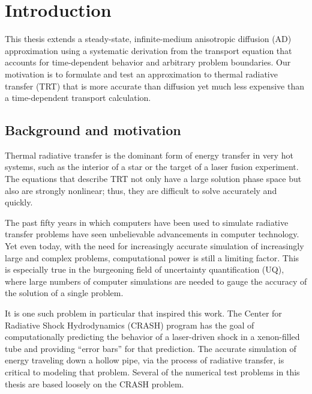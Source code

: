 
\chapter{Introduction}\label{chap:introduction}

This thesis extends a steady-state, infinite-medium anisotropic diffusion (AD)
approximation \cite{Mor2007,Lar2009c} using a systematic derivation from the
transport equation that accounts for time-dependent behavior and arbitrary
problem boundaries. Our motivation is to formulate and test an approximation to
thermal radiative transfer (TRT) that is more accurate than diffusion yet much
less expensive than a time-dependent transport calculation.

\section{Background and motivation}

Thermal radiative transfer is the dominant form of energy transfer in very
hot systems, such as the interior of a star or the target of a laser fusion
experiment. The equations that describe TRT not only have a large solution
phase space but also are strongly nonlinear; thus, they are difficult to solve
accurately and quickly.

The past fifty years in which computers have been used to simulate radiative
transfer problems \cite{Cam1964,Cam1969} have seen unbelievable
advancements in computer technology.
Yet even today, with the need for increasingly accurate simulation of
increasingly
large and complex problems, computational power is still a limiting factor.
This is especially true in the burgeoning field of uncertainty quantification
(UQ), where large numbers of computer simulations are needed to gauge the
accuracy of the solution of a single problem.

It is one such problem in particular that inspired this work. The Center for
Radiative Shock Hydrodynamics (CRASH) program \cite{Crash2010} has the goal of
computationally predicting the behavior of a laser-driven shock in a
xenon-filled tube and providing ``error bars'' for that prediction. The accurate
simulation of energy traveling down a hollow pipe, via the process of
radiative transfer, is critical to modeling that problem. Several of the
numerical test problems in this thesis are based loosely on the CRASH problem.

